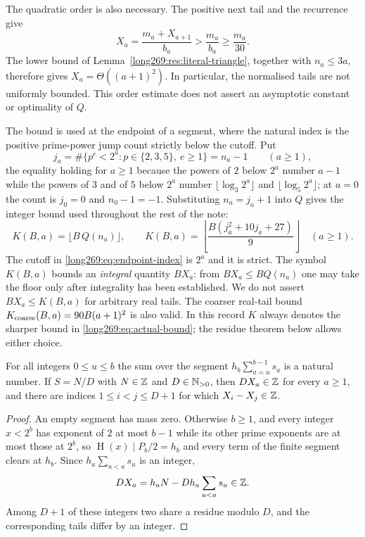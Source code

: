 \documentclass[11pt]{article}
\theoremstyle{remark}
\theoremstyle{plain}
\newcommand{\hgt}{\operatorname{H}}
\begin{document}
The quadratic order is also necessary.  The positive next tail and the
recurrence give
\[
 X_a=\frac{m_a+X_{a+1}}{b_a}>\frac{m_a}{b_a}\ge\frac{m_a}{30}.
\]
The lower bound of Lemma~\ref{long269:res:literal-triangle}, together
with $n_a\le3a$, therefore gives $X_a=\Theta((a+1)^2)$.  In particular,
the normalised tails are not uniformly bounded.  This order estimate
does not assert an asymptotic constant or optimality of $Q$.

The bound is used at the endpoint of a segment, where the natural index is the
positive prime-power jump count strictly below the cutoff.  Put
\begin{equation}\label{long269:eq:endpoint-index}
 j_a=\#\{p^{e}<2^{a}:p\in\{2,3,5\},\ e\ge1\}=n_a-1\qquad(a\ge1),
\end{equation}
the equality holding for $a\ge1$ because the powers of $2$ below $2^{a}$ number
$a-1$ while the powers of $3$ and of $5$ below $2^{a}$ number
$\lfloor\log_3 2^{a}\rfloor$ and $\lfloor\log_5 2^{a}\rfloor$; at $a=0$ the
count is $j_0=0$ and $n_0-1=-1$.  Substituting $n_a=j_a+1$ into $Q$ gives the
integer bound used throughout the rest of the note:
\begin{equation}\label{long269:eq:actual-bound}
 K(B,a)=\bigl\lfloor B\,Q(n_a)\bigr\rfloor,
 \qquad
 K(B,a)=\left\lfloor\frac{B(j_a^{2}+10j_a+27)}9\right\rfloor\quad(a\ge1).
\end{equation}
The cutoff in \eqref{long269:eq:endpoint-index} is $2^{a}$ and it is strict.
The symbol $K(B,a)$ bounds an \emph{integral} quantity
$BX_a$: from $BX_a\le BQ(n_a)$ one may take the floor only after integrality
has been established.  We do not assert $BX_a\le K(B,a)$ for arbitrary
real tails. The coarser real-tail bound
$K_{\rm coarse}(B,a)=90B(a+1)^2$ is also valid. In this record $K$ always denotes the
sharper bound in \eqref{long269:eq:actual-bound}; the residue theorem
below allows either choice.



\begin{lemma}\label{long269:res:all-scale-lattice}
For all integers $0\le u\le b$ the sum over the segment $h_b\sum_{a=u}^{b-1}s_a$ is a
natural number.  If $S=N/D$ with $N\in\mathbb{Z}$ and $D\in\mathbb{N}_{>0}$, then $DX_a\in\mathbb{Z}$
for every $a\ge1$, and there are indices $1\le i<j\le D+1$ for which
$X_i-X_j\in\mathbb{Z}$.
\end{lemma}

\begin{proof}
An empty segment has mass zero.  Otherwise $b\ge1$, and every integer $x<2^{b}$
has exponent of $2$ at most $b-1$ while its other prime exponents are at
most those at $2^{b}$, so $\hgt(x)\mid P_b/2=h_b$ and every term of the
finite segment clears at $h_b$.  Since $h_a\sum_{u<a}s_u$ is an integer,
\[
 DX_a=h_aN-Dh_a\sum_{u<a}s_u\in\mathbb{Z}.
\]
Among $D+1$ of these integers two share a residue
modulo $D$, and the corresponding tails differ by an integer.
\end{proof}
\end{document}
